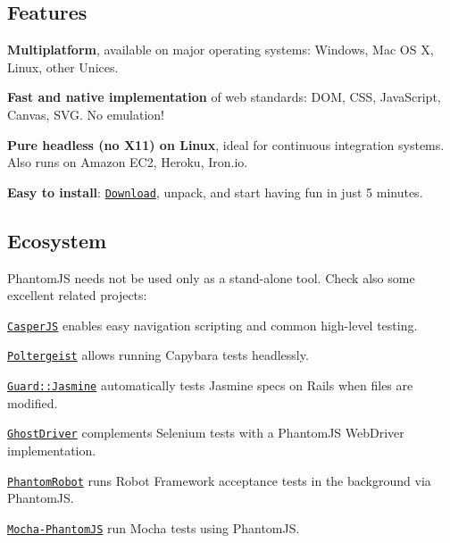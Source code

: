 \subsection*{Features}


\begin{DoxyItemize}
\item {\bfseries Multiplatform}, available on major operating systems\+: Windows, Mac O\+S X, Linux, other Unices.
\item {\bfseries Fast and native implementation} of web standards\+: D\+O\+M, C\+S\+S, Java\+Script, Canvas, S\+V\+G. No emulation!
\item {\bfseries Pure headless (no X11) on Linux}, ideal for continuous integration systems. Also runs on Amazon E\+C2, Heroku, Iron.\+io.
\item {\bfseries Easy to install}\+: \href{http://phantomjs.org/download.html}{\tt Download}, unpack, and start having fun in just 5 minutes.
\end{DoxyItemize}

\subsection*{Ecosystem}

Phantom\+J\+S needs not be used only as a stand-\/alone tool. Check also some excellent related projects\+:


\begin{DoxyItemize}
\item \href{http://casperjs.org}{\tt Casper\+J\+S} enables easy navigation scripting and common high-\/level testing.
\item \href{https://github.com/jonleighton/poltergeist}{\tt Poltergeist} allows running Capybara tests headlessly.
\item \href{https://github.com/netzpirat/guard-jasmine}{\tt Guard\+::\+Jasmine} automatically tests Jasmine specs on Rails when files are modified.
\item \href{http://github.com/detro/ghostdriver/}{\tt Ghost\+Driver} complements Selenium tests with a Phantom\+J\+S Web\+Driver implementation.
\item \href{https://github.com/datakurre/phantomrobot}{\tt Phantom\+Robot} runs Robot Framework acceptance tests in the background via Phantom\+J\+S.
\item \href{https://github.com/metaskills/mocha-phantomjs}{\tt Mocha-\/\+Phantom\+J\+S} run Mocha tests using Phantom\+J\+S.
\end{DoxyItemize}

